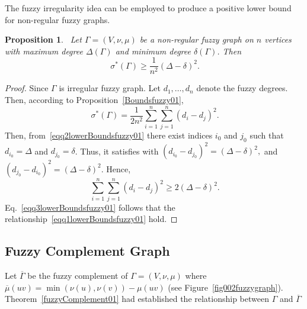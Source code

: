 \documentclass[12pt]{amsart}
\newtheorem{proposition}{Proposition}[section]
\newcommand{\SF}{\sigma^*}
\begin{document}
The fuzzy irregularity idea can be employed to produce a positive lower bound for non-regular fuzzy graphs.

\begin{proposition}~\label{lowerBoundsfuzzy01}
Let $\Gamma=(V, \nu,\mu)$ be a non-regular fuzzy graph on $n$ vertices with  maximum degree $\Delta(\Gamma)$ and minimum degree $\delta(\Gamma)$. Then
\begin{equation}~\label{eqq1lowerBoundsfuzzy01}
\SF(\Gamma)\geqslant  \frac{1}{n^2}\left(\Delta-\delta\right)^2.
\end{equation}
\end{proposition}
\begin{proof}
Since $\Gamma$ is irregular fuzzy graph. Let $d_1,\dots,d_n$ denote the fuzzy degrees. Then, according to Proposition~\ref{Boundsfuzzy01}, 
\begin{equation}~\label{eqq2lowerBoundsfuzzy01}
\SF(\Gamma)=\frac{1}{2n^2} \sum_{i=1}^n \sum_{j=1}^n (d_i - d_j)^2.
\end{equation}
Then, from~\eqref{eqq2lowerBoundsfuzzy01} there exist indices $i_0$ and $j_0$ such that $d_{i_0} = \Delta$ and $d_{j_0} = \delta$. Thus, it satisfies with $(d_{i_0} - d_{j_0})^2 = (\Delta - \delta)^2,$ and $(d_{j_0} - d_{i_0})^2 = (\Delta - \delta)^2$. Hence,
\begin{equation}~\label{eqq3lowerBoundsfuzzy01}
\sum_{i=1}^n \sum_{j=1}^n (d_i - d_j)^2 \geqslant 2(\Delta - \delta)^2.
\end{equation}
Eq.~\eqref{eqq3lowerBoundsfuzzy01} follows that the relationship~\eqref{eqq1lowerBoundsfuzzy01} hold.
\end{proof}



\subsection{Fuzzy Complement Graph}
Let $\overline{\Gamma}$ be the fuzzy complement of $\Gamma=(V,\nu,\mu)$ where $\overline{\mu}(uv)=\min(\nu(u),\nu(v))-\mu(uv)$ (see Figure~\ref{fig002fuzzygraph}). Theorem~\ref{fuzzyComplement01} had established the relationship between $\Gamma$ and $\overline{\Gamma}$
\end{document}

